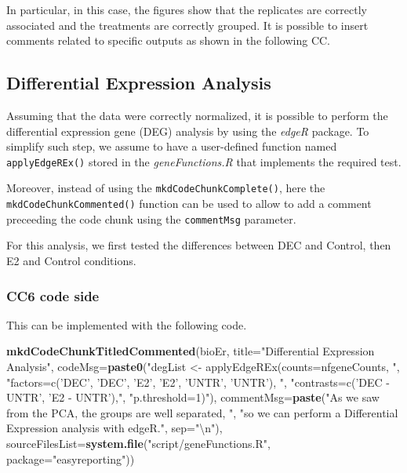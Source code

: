 \documentclass[]{article}
\newenvironment{Shaded}{\begin{snugshade}}{\end{snugshade}}
\newcommand{\CharTok}[1]{\textcolor[rgb]{0.31,0.60,0.02}{#1}}
\newcommand{\DataTypeTok}[1]{\textcolor[rgb]{0.13,0.29,0.53}{#1}}
\newcommand{\KeywordTok}[1]{\textcolor[rgb]{0.13,0.29,0.53}{\textbf{#1}}}
\newcommand{\NormalTok}[1]{#1}
\newcommand{\StringTok}[1]{\textcolor[rgb]{0.31,0.60,0.02}{#1}}
\begin{document}
In particular, in this case, the figures show that the replicates are
correctly associated and the treatments are correctly grouped. It is
possible to insert comments related to specific outputs as shown in the
following CC.

\hypertarget{differential-expression-analysis}{%
\subsection{Differential Expression
Analysis}\label{differential-expression-analysis}}

Assuming that the data were correctly normalized, it is possible to
perform the differential expression gene (DEG) analysis by using the
\emph{edgeR} package. To simplify such step, we assume to have a
user-defined function named \texttt{applyEdgeREx()} stored in the
\emph{geneFunctions.R} that implements the required test.

Moreover, instead of using the \texttt{mkdCodeChunkComplete()}, here the
\texttt{mkdCodeChunkCommented()} function can be used to allow to add a
comment preceeding the code chunk using the \texttt{commentMsg}
parameter.

For this analysis, we first tested the differences between DEC and
Control, then E2 and Control conditions.

\hypertarget{cc6-code-side}{%
\subsubsection{CC6 code side}\label{cc6-code-side}}

This can be implemented with the following code.

\begin{Shaded}
\begin{Highlighting}[]
\KeywordTok{mkdCodeChunkTitledCommented}\NormalTok{(bioEr, }\DataTypeTok{title=}\StringTok{"Differential Expression Analysis"}\NormalTok{,}
                \DataTypeTok{codeMsg=}\KeywordTok{paste0}\NormalTok{(}\StringTok{"degList <- applyEdgeREx(counts=nfgeneCounts, "}\NormalTok{,}
                \StringTok{"factors=c('DEC', 'DEC', 'E2', 'E2', 'UNTR', 'UNTR'), "}\NormalTok{,}
                \StringTok{"contrasts=c('DEC - UNTR', 'E2 - UNTR'),"}\NormalTok{,}
                \StringTok{"p.threshold=1)"}\NormalTok{),}
            \DataTypeTok{commentMsg=}\KeywordTok{paste}\NormalTok{(}\StringTok{"As we saw from the PCA, the groups are well separated, "}\NormalTok{,}
            \StringTok{"so we can perform a Differential Expression analysis with edgeR."}\NormalTok{, }\DataTypeTok{sep=}\StringTok{"}\CharTok{\textbackslash{}n}\StringTok{"}\NormalTok{),}
            \DataTypeTok{sourceFilesList=}\KeywordTok{system.file}\NormalTok{(}\StringTok{"script/geneFunctions.R"}\NormalTok{, }\DataTypeTok{package=}\StringTok{"easyreporting"}\NormalTok{))}
\end{Highlighting}
\end{Shaded}
\end{document}
